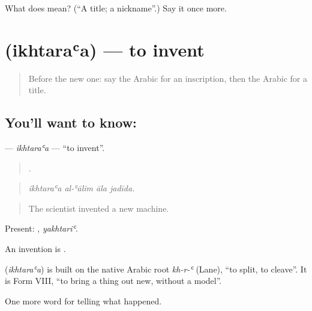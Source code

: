 \begin{tcolorbox}[breakable,colback=teal!4,colframe=teal!35!black,title={Before you move on}]
What does  mean? (\textquotedblleft{}A title; a nickname\textquotedblright{}.) Say it once more.
\end{tcolorbox}
\section[\texorpdfstring{\ar{اخترع} (ikhtaraʿa)}{اخترع (ikhtaraʿa)}]{ (ikhtaraʿa) — to invent}

\label{lesson:AR-C342-ikhtaraa}



\begin{quote}
Before the new one: say the Arabic for an inscription, then the Arabic for a title.
\end{quote}

\subsection*{You'll want to know: }
\textbf{} — \emph{ikhtaraʿa} — \textquotedblleft{}to invent\textquotedblright{}.

\begin{quote}
   .
\end{quote}

\begin{quote}
\emph{ikhtaraʿa al-ʿālim āla jadīda.}
\end{quote}

\begin{quote}
The scientist invented a new machine.
\end{quote}

Present: , \emph{yakhtariʿ}.

An invention is .

\begin{cousinweb}
\textbf{} (\emph{ikhtaraʿa}) is built on the native Arabic root \emph{kh-r-ʿ} (Lane), \textquotedblleft{}to split, to cleave\textquotedblright{}. It is Form VIII, \textquotedblleft{}to bring a thing out new, without a model\textquotedblright{}.
\end{cousinweb}

\begin{grammarlens}[title={What you've built}]
One more word for telling what happened.
\end{grammarlens}

